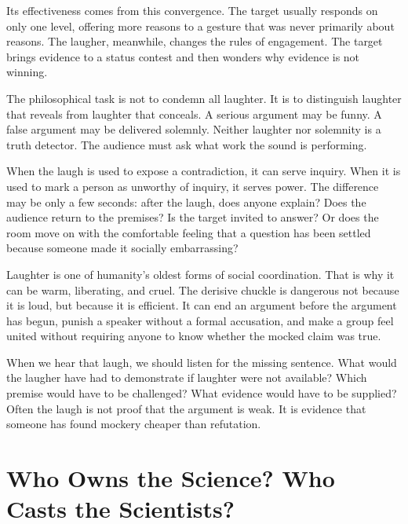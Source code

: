﻿\documentclass[12pt,a4paper]{book}
\begin{document}
Its effectiveness comes from this convergence. The target usually responds on only one level, offering more reasons to a gesture that was never primarily about reasons. The laugher, meanwhile, changes the rules of engagement. The target brings evidence to a status contest and then wonders why evidence is not winning.

The philosophical task is not to condemn all laughter. It is to distinguish laughter that reveals from laughter that conceals. A serious argument may be funny. A false argument may be delivered solemnly. Neither laughter nor solemnity is a truth detector. The audience must ask what work the sound is performing.

When the laugh is used to expose a contradiction, it can serve inquiry. When it is used to mark a person as unworthy of inquiry, it serves power. The difference may be only a few seconds: after the laugh, does anyone explain? Does the audience return to the premises? Is the target invited to answer? Or does the room move on with the comfortable feeling that a question has been settled because someone made it socially embarrassing?

Laughter is one of humanity's oldest forms of social coordination. That is why it can be warm, liberating, and cruel. The derisive chuckle is dangerous not because it is loud, but because it is efficient. It can end an argument before the argument has begun, punish a speaker without a formal accusation, and make a group feel united without requiring anyone to know whether the mocked claim was true.

When we hear that laugh, we should listen for the missing sentence. What would the laugher have had to demonstrate if laughter were not available? Which premise would have to be challenged? What evidence would have to be supplied? Often the laugh is not proof that the argument is weak. It is evidence that someone has found mockery cheaper than refutation.


%
%   
%   

\chapter{Who Owns the Science? Who Casts the Scientists?}
\label{chap:who-owns-the-science}
\setlength{\emergencystretch}{3em}
\end{document}
